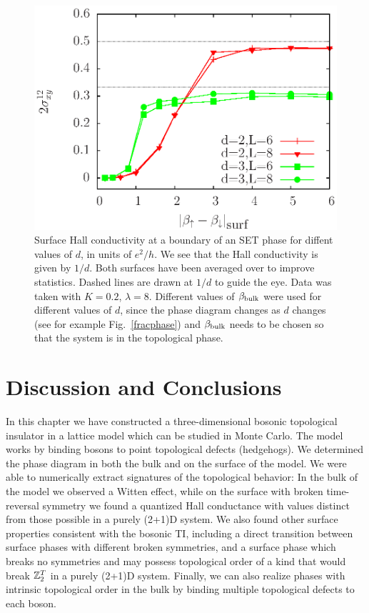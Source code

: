 \begin{figure}
\includegraphics[width=\linewidth]{figures/halldiff.eps}
\caption{Surface Hall conductivity at a boundary of an SET phase for diffent values of $d$, in units of $e^2/h$. We see that the Hall conductivity is given by $1/d$. Both surfaces have been averaged over to improve statistics. Dashed lines are drawn at $1/d$ to guide the eye. Data was taken with $K=0.2$, $\lambda=8$. Different values of $\beta_{\rm bulk}$ were used for different values of $d$, since the phase diagram changes as $d$ changes (see for example Fig.~\ref{fracphase}) and $\beta_{\rm bulk}$ needs to be chosen so that the system is in the topological phase.
}
\label{halldiff}
\end{figure}


\section{Discussion and Conclusions}
\label{sec::discussion}
In this chapter we have constructed a three-dimensional bosonic topological insulator in a lattice model which can be studied in Monte Carlo. The model works by binding bosons to point topological defects (hedgehogs). We determined the phase diagram in both the bulk and on the surface of the model. We were able to numerically extract signatures of the topological behavior: In the bulk of the model we observed a Witten effect, while on the surface with broken time-reversal symmetry we found a quantized Hall conductance with values distinct from those possible in a purely (2+1)D system. We also found other surface properties consistent with the bosonic TI, including a direct transition between surface phases with different broken symmetries, and a surface phase which breaks no symmetries and may possess topological order of a kind that would break $\mathbb{Z}_2^T$ in a purely (2+1)D system. Finally, we can also realize phases with intrinsic topological order in the bulk by binding multiple topological defects to each boson.

